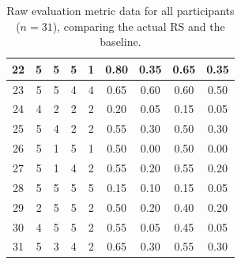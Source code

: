 \begin{table}[ht]
\begin{tabular}{|c|cc|cc|cc|cc|}
22 & 5 & 5 & 5 & 1 & 0.80 & 0.35 & 0.65 & 0.35 \\ \hline
23 & 5 & 5 & 4 & 4 & 0.65 & 0.60 & 0.60 & 0.50 \\ \hline
24 & 4 & 2 & 2 & 2 & 0.20 & 0.05 & 0.15 & 0.05 \\ \hline
25 & 5 & 4 & 2 & 2 & 0.55 & 0.30 & 0.50 & 0.30 \\ \hline
26 & 5 & 1 & 5 & 1 & 0.50 & 0.00 & 0.50 & 0.00 \\ \hline
27 & 5 & 1 & 4 & 2 & 0.55 & 0.20 & 0.55 & 0.20 \\ \hline
28 & 5 & 5 & 5 & 5 & 0.15 & 0.10 & 0.15 & 0.05 \\ \hline
29 & 2 & 5 & 5 & 2 & 0.50 & 0.20 & 0.40 & 0.20 \\ \hline
30 & 4 & 5 & 5 & 2 & 0.55 & 0.05 & 0.45 & 0.05 \\ \hline
31 & 5 & 3 & 4 & 2 & 0.65 & 0.30 & 0.55 & 0.30 \\ \hline
\end{tabular}
\caption{Raw evaluation metric data for all participants ($n=31$), comparing the actual RS and the baseline.}
\label{tab:raw-metrics-data}
\end{table}
